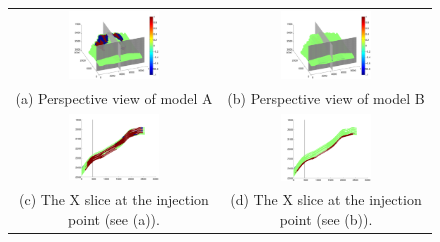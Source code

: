 \begin{figure}
\begin{tabular}{cc}
\includegraphics[width=0.45\textwidth]{./figurer/C02222_FlowSign_pers}&
\includegraphics[width=0.45\textwidth]{./figurer/C03211_FlowSign_pers}
\\(a) Perspective view of model A&(b) Perspective view of model B\\
\includegraphics[width=0.45\textwidth]{./figurer/C02222_FlowSign_slcx}&
\includegraphics[width=0.45\textwidth]{./figurer/C03211_FlowSign_slcx}
\\(c) The X slice at the injection point (see (a)).&
(d) The X slice at the injection point (see (b)).\\

\end{tabular}
\end{figure}
